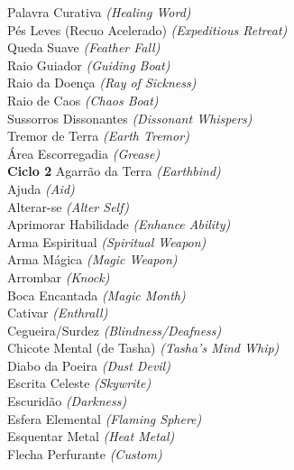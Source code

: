 \documentclass{RPG_Adventure}[2021/10/20]
\begin{document}
{\normalsize Palavra Curativa \textit{(Healing Word)}\\ }
{\normalsize Pés Leves (Recuo Acelerado) \textit{(Expeditious Retreat)}\\ }
{\normalsize Queda Suave \textit{(Feather Fall)}\\ }
{\normalsize Raio Guiador \textit{(Guiding Boat)}\\ }
{\normalsize Raio da Doença \textit{(Ray of Sickness)}\\ }
{\normalsize Raio de Caos \textit{(Chaos Boat)}\\ }
{\normalsize Sussorros Dissonantes \textit{(Dissonant Whispers)}\\ }
{\normalsize Tremor de Terra \textit{(Earth Tremor)}\\ }
{\normalsize Área Escorregadia \textit{(Grease)}\\ }
\jump\noindent\textbf{Ciclo 2}
{\normalsize Agarrão da Terra \textit{(Earthbind)}\\ }
{\normalsize Ajuda \textit{(Aid)}\\ }
{\normalsize Alterar-se \textit{(Alter Self)}\\ }
{\normalsize Aprimorar Habilidade \textit{(Enhance Ability)}\\ }
{\normalsize Arma Espiritual \textit{(Spiritual Weapon)}\\ }
{\normalsize Arma Mágica \textit{(Magic Weapon)}\\ }
{\normalsize Arrombar \textit{(Knock)}\\ }
{\normalsize Boca Encantada \textit{(Magic Month)}\\ }
{\normalsize Cativar \textit{(Enthrall)}\\ }
{\normalsize Cegueira/Surdez \textit{(Blindness/Deafness)}\\ }
{\normalsize Chicote Mental (de Tasha) \textit{(Tasha's Mind Whip)}\\ }
{\normalsize Diabo da Poeira \textit{(Dust Devil)}\\ }
{\normalsize Escrita Celeste \textit{(Skywrite)}\\ }
{\normalsize Escuridão \textit{(Darkness)}\\ }
{\normalsize Esfera Elemental \textit{(Flaming Sphere)}\\ }
{\normalsize Esquentar Metal \textit{(Heat Metal)}\\ }
{\normalsize Flecha Perfurante \textit{(Custom)}\\ }
\end{document}

